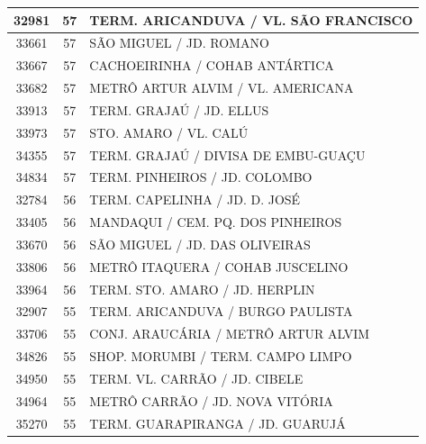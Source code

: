 \documentclass[
	12pt,				%
	oneside,			%
	a4paper,			%
	english,			%
	brazil				%
	]{abntex2ppgsi}
\begin{document}
{{\begin{apendicesenv}
\begin{longtable}{c|c|p{7cm}}
    32981 & 57    & TERM. ARICANDUVA / VL. SÃO FRANCISCO \\
\hline

    33661 & 57    & SÃO MIGUEL / JD. ROMANO \\
\hline

    33667 & 57    & CACHOEIRINHA / COHAB ANTÁRTICA \\
\hline

    33682 & 57    & METRÔ ARTUR ALVIM / VL. AMERICANA \\
\hline

    33913 & 57    & TERM. GRAJAÚ / JD. ELLUS \\
\hline

    33973 & 57    & STO. AMARO / VL. CALÚ \\
\hline

    34355 & 57    & TERM. GRAJAÚ / DIVISA DE EMBU-GUAÇU \\
\hline

    34834 & 57    & TERM. PINHEIROS / JD. COLOMBO \\
\hline

    32784 & 56    & TERM. CAPELINHA / JD. D. JOSÉ \\
\hline

    33405 & 56    & MANDAQUI / CEM. PQ. DOS PINHEIROS \\
\hline

    33670 & 56    & SÃO MIGUEL / JD. DAS OLIVEIRAS \\
\hline

    33806 & 56    & METRÔ ITAQUERA / COHAB JUSCELINO \\
\hline

    33964 & 56    & TERM. STO. AMARO / JD. HERPLIN \\
\hline

    32907 & 55    & TERM. ARICANDUVA / BURGO PAULISTA \\
\hline

    33706 & 55    & CONJ. ARAUCÁRIA / METRÔ ARTUR ALVIM \\
\hline

    34826 & 55    & SHOP. MORUMBI / TERM. CAMPO LIMPO \\
\hline

    34950 & 55    & TERM. VL. CARRÃO / JD. CIBELE \\
\hline

    34964 & 55    & METRÔ CARRÃO / JD. NOVA VITÓRIA \\
\hline

    35270 & 55    & TERM. GUARAPIRANGA / JD. GUARUJÁ \\
\hline


\end{longtable}
\end{apendicesenv}}}
\end{document}
